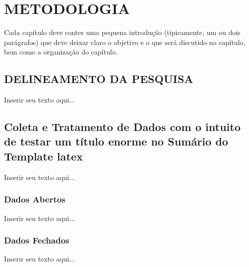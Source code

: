 
\chapter{METODOLOGIA}
\label{chap:metodologia}
Cada capítulo deve conter uma pequena introdução (tipicamente, um ou dois parágrafos) que deve deixar claro o objetivo e o que será discutido no capítulo, bem como a organização do capítulo.

\section{DELINEAMENTO DA PESQUISA}
\label{sec:titSecDelPesq}

Inserir seu texto aqui...

\section{Coleta e Tratamento de Dados com o intuito de testar um título enorme no Sumário do Template latex}
\label{sec:titSecColDad}

Inserir seu texto aqui...

\subsection{Dados Abertos}
\label{sec:titSecColDadAbertos}
Inserir seu texto aqui...

\subsection{Dados Fechados}
\label{sec:titSecColDadFechados}
Inserir seu texto aqui...